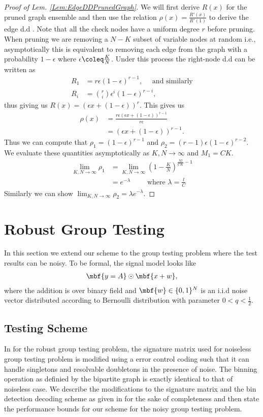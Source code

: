 \documentclass[conference,twocolumn]{IEEEtran}
\begin{document}
\begin{proof}[Proof of Lem. \ref{Lem:EdgeDDPrunedGraph}]
We will first derive $R(x)$ for the pruned graph ensemble and then use the relation\cite{richardson2008modern} $\rho(x)=\frac{R'(x)}{R'(1)}$ to derive the edge d.d . Note that all the check nodes have a uniform degree $r$ before pruning. When pruning we are removing a $N-K$ subset of variable nodes at random i.e., asymptotically this is equivalent to removing each edge from the graph with a probability $1-\epsilon$ where $\epsilon\coleq \frac{K}{N}$. Under this process the right-node d.d can be written as
\begin{align*}
R_1&=r\epsilon(1-\epsilon)^{r-1},\quad \text{ and similarly}\\
R_i &=\binom{r}{i} \epsilon^{i}(1-\epsilon)^{r-i},
\end{align*}
thus giving us $R(x)=(\epsilon x+(1-\epsilon))^{r}$. This gives us 
\begin{align*}
\rho(x)&=\frac{r\epsilon(\epsilon x+(1-\epsilon))^{r-1}}{r\epsilon}\\
          &=(\epsilon x+(1-\epsilon))^{r-1}.
\end{align*}
Thus we can compute that $\rho_1=(1-\epsilon)^{r-1}$ and $\rho_2=(r-1)\epsilon(1-\epsilon)^{r-2}$. We evaluate these quantities asymptotically as $K,N\rightarrow \infty$ and $M_1=CK$.
\begin{align*}
\lim_{K,N\rightarrow \infty} \rho_1&=\lim_{K,N\rightarrow \infty} (1-\frac{K}{N})^{\frac{Nl}{CK}-1}\\
&=e^{-\lambda} \qquad \text{ where } \lambda=\frac{l}{C}
\end{align*}
Similarly we can show $\lim_{K,N\rightarrow \infty}\rho_2=\lambda e^{-\lambda}$.
\end{proof}

\section{Robust Group Testing}
In this section we extend our scheme to the group testing problem where the test results can be noisy. To be formal, the signal model looks like
\begin{align*}
\mbf{y=A}\odot \mbf{x+w},
\end{align*}
where the addition is over binary field and $\mbf{w}\in\{0,1\}^N$ is an i.i.d noise vector distributed according to Bernoulli distribution with parameter $0<q<\frac{1}{2}$.

\subsection*{Testing Scheme}
In \cite{lee2015saffron} for the robust group testing problem, the signature matrix used for noiseless group testing problem is modified using a error control coding such that it can handle singletons and resolvable doubletons in the presence of noise. The binning operation as definied by the bipartite graph is exactly identical to that of noiseless case. We describe the modifications to the signature matrix and the bin detection decoding scheme as given in \cite{lee2015saffron} for the sake of completeness and then state the performance bounds for our scheme for the noisy group testing problem.
\end{document}
